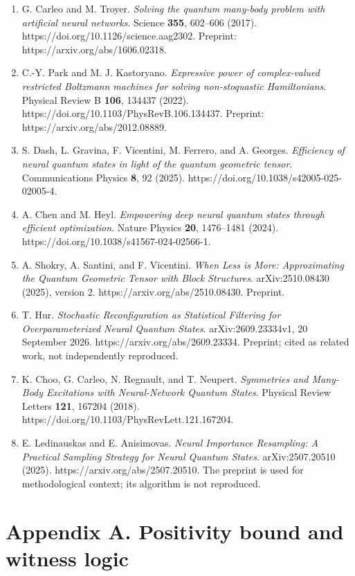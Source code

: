 \documentclass[
  11pt,
  a4paper,
]{article}
\providecommand{\tightlist}{%
  \setlength{\itemsep}{0pt}\setlength{\parskip}{0pt}}
\begin{document}
\begin{enumerate}
\def\labelenumi{\arabic{enumi}.}
\tightlist
\item
  G. Carleo and M. Troyer. \emph{Solving the quantum many-body problem
  with artificial neural networks}. Science \textbf{355}, 602--606
  (2017). https://doi.org/10.1126/science.aag2302. Preprint:
  https://arxiv.org/abs/1606.02318.
\item
  C.-Y. Park and M. J. Kastoryano. \emph{Expressive power of
  complex-valued restricted Boltzmann machines for solving
  non-stoquastic Hamiltonians}. Physical Review B \textbf{106}, 134437
  (2022). https://doi.org/10.1103/PhysRevB.106.134437. Preprint:
  https://arxiv.org/abs/2012.08889.
\item
  S. Dash, L. Gravina, F. Vicentini, M. Ferrero, and A. Georges.
  \emph{Efficiency of neural quantum states in light of the quantum
  geometric tensor}. Communications Physics \textbf{8}, 92 (2025).
  https://doi.org/10.1038/s42005-025-02005-4.
\item
  A. Chen and M. Heyl. \emph{Empowering deep neural quantum states
  through efficient optimization}. Nature Physics \textbf{20},
  1476--1481 (2024). https://doi.org/10.1038/s41567-024-02566-1.
\item
  A. Shokry, A. Santini, and F. Vicentini. \emph{When Less is More:
  Approximating the Quantum Geometric Tensor with Block Structures}.
  arXiv:2510.08430 (2025), version 2. https://arxiv.org/abs/2510.08430.
  Preprint.
\item
  T. Hur. \emph{Stochastic Reconfiguration as Statistical Filtering for
  Overparameterized Neural Quantum States}. arXiv:2609.23334v1, 20
  September 2026. https://arxiv.org/abs/2609.23334. Preprint; cited as
  related work, not independently reproduced.
\item
  K. Choo, G. Carleo, N. Regnault, and T. Neupert. \emph{Symmetries and
  Many-Body Excitations with Neural-Network Quantum States}. Physical
  Review Letters \textbf{121}, 167204 (2018).
  https://doi.org/10.1103/PhysRevLett.121.167204.
\item
  E. Ledinauskas and E. Anisimovas. \emph{Neural Importance Resampling:
  A Practical Sampling Strategy for Neural Quantum States}.
  arXiv:2507.20510 (2025). https://arxiv.org/abs/2507.20510. The
  preprint is used for methodological context; its algorithm is not
  reproduced.
\end{enumerate}

\hypertarget{appendix-a.-positivity-bound-and-witness-logic}{%
\section{Appendix A. Positivity bound and witness
logic}\label{appendix-a.-positivity-bound-and-witness-logic}}
\end{document}
